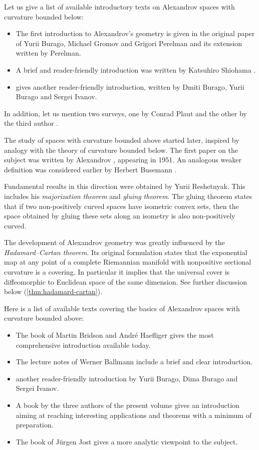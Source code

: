 %
Let us give a list of available introductory texts on Alexandrov spaces with curvature bounded below: 
\begin{itemize}
\item The first introduction to Alexandrov's geometry is given in the original paper of Yurii Burago, Michael Gromov and Grigori Perelman \cite{burago-gromov-perelman} 
and its extension \cite{perelman:spaces2} written by Perelman.
\item A brief and reader-friendly introduction was written by Katsuhiro Shiohama \cite[Sections 1--8]{shiohama}.
\item \cite[Chapter 10]{burago-burago-ivanov} gives another reader-friendly introduction, written by Dmiti Burago, Yurii Burago and Sergei Ivanov.
\end{itemize}
In addition, let us mention two surveys, one by Conrad Plaut \cite{plaut:survey} and the other by the third author \cite{petrunin:survey}.

The study of  spaces with curvature bounded above started later,
inspired by analogy with the theory of curvature bounded below.
The first paper on the subject was written by Alexandrov \cite{alexandrov:strong-angle}, appearing in 1951.
An analogous weaker definition was considered earlier by Herbert Busemann \cite{busemann-CBA}.

Fundamental results in this direction were obtained by Yurii Reshetnyak.
This includes his {}\emph{majorization theorem} and {}\emph{gluing theorem}.
The gluing theorem states that if two non-positively curved spaces have isometric convex sets, then the space obtained by gluing these sets along an isometry is also non-positively curved.

The development of Alexandrov geometry was greatly influenced by the {}\emph{Hadamard--Cartan theorem}.
Its original formulation states that the exponential map at any point of a complete Riemannian manifold with nonpositive sectional curvature is a covering.
In particular it implies that the universal cover is diffeomorphic to Euclidean space of the same dimension. 
See further discussion below (\ref{thm:hadamard-cartan}).

Here is a list of available texts covering the basics of Alexandrov spaces with curvature bounded above: 
\begin{itemize}
\item The book of Martin Bridson and Andr\'e Haefliger \cite{bridson-haefliger} gives the most comprehensive introduction available today. 
\item The lecture notes of Werner Ballmann \cite{ballmann:lectures} include a brief 
and clear
introduction.
\item \cite[Chapter 9]{burago-burago-ivanov} another reader-friendly introduction by Yurii Burago, Dima Burago and Sergei Ivanov.
\item A book  by the three authors of the present volume  \cite{alexander-kapovitch-petrunin-CAT} gives an introduction aiming at reaching interesting applications and theorems with a minimum of preparation.
\item The book of J\"{u}rgen Jost \cite{jost} gives a more analytic viewpoint to the subject.
\end{itemize}


